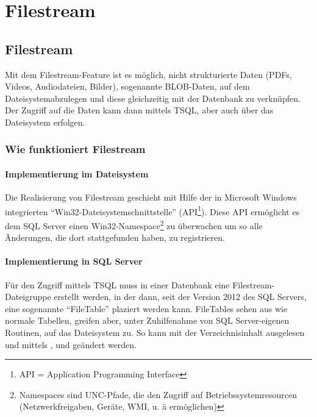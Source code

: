   \chapter{Filestream}
    \setcounter{page}{1}
    \minitoc
\newpage

    \section{Filestream}
      Mit dem Filestream-Feature ist es möglich, nicht strukturierte Daten
      (PDFs, Videos, Audiodateien, Bilder), sogenannte BLOB-Daten, auf dem
      Dateisystemabzulegen und diese gleichzeitig mit der Datenbank zu
      verknüpfen. Der Zugriff auf die Daten kann dann mittels TSQL, aber auch
      über das Dateisystem erfolgen.
      \subsection{Wie funktioniert Filestream}
        \subsubsection{Implementierung im Dateisystem}
          Die Realisierung von Filestream geschieht mit Hilfe der in Microsoft
          Windows integrierten \enquote{Win32-Dateisystemschnittstelle}
          (API\footnote{API = Application Programming Interface}).
          Diese API ermöglicht es dem SQL Server einen
          Win32-Namespace\footnote{Namespaces sind UNC-Pfade, die den Zugriff
          auf Betriebssystemresourcen (Netzwerkfreigaben, Geräte, WMI, u. ä
          ermöglichen)} zu überwachen um so alle Änderungen, die dort
          stattgefunden haben, zu registrieren.
        
        \subsubsection{Implementierung in SQL Server}
          Für den Zugriff mittels TSQL muss in einer Datenbank eine
          Filestream-Dateigruppe erstellt werden, in der dann, seit
          der Version 2012 des SQL Servers, eine sogenannte \enquote{FileTable}
          plaziert werden kann. FileTables sehen aus wie normale Tabellen,
          greifen aber, unter Zuhilfenahme von SQL Server-eigenen Routinen, auf
          das Dateisystem zu. So kann mit \SELECT{} der Verzeichnisinhalt
          ausgelesen und mittels \INSERT, \UPDATE{} und \DELETE{} geändert werden.
        
